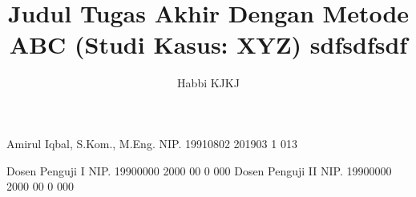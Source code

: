 \documentclass[article]{report} %
\begin{document}
    
    \title{Judul Tugas Akhir Dengan Metode ABC (Studi Kasus: XYZ) sdfsdfsdf}
    
	\author{Habbi KJKJ}		%
	
	\dosbingA%
		{Amirul Iqbal, S.Kom., M.Eng.}%
		{NIP. 19910802 201903 1 013}	%
		
	\pengujiA%
		{Dosen Penguji I}%
		{NIP. 19900000 2000 00 0 000}	%
	\pengujiB%
		{Dosen Penguji II}%
		{NIP. 19900000 2000 00 0 000}	%

	\sloppy %
    \setcounter{page}{1} %
\end{document}
